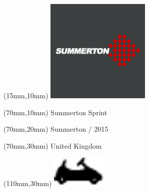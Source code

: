 \null\newpage
\begin{textblock*}{50mm}(15mm,10mm)%
\includegraphics[width=50mm]{LG/SUMM.png}
\end{textblock*}
\begin{textblock*}{130mm}(70mm,10mm)%
{\fontsize{20}{20}\selectfont Summerton Sprint}\\
\end{textblock*}
\begin{textblock*}{120mm}(70mm,20mm)%
{\fontsize{16}{16}\selectfont Summerton / 2015}\\
\end{textblock*}
\begin{textblock*}{120mm}(70mm,30mm)%
{\fontsize{12}{12}\selectfont United Kingdom}
\end{textblock*}
\begin{textblock*}{30mm}(110mm,30mm)%
\centering
\includegraphics[height=15mm]{icons/kart.pdf}
\end{textblock*}
